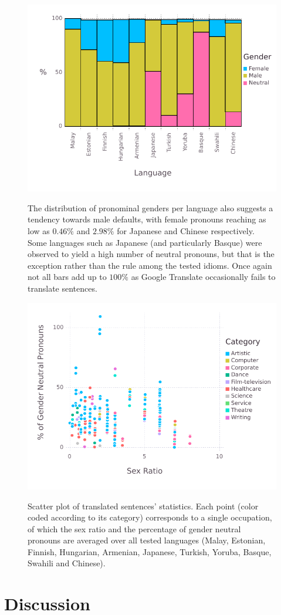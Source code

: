 \documentclass{article}
\begin{document}
\begin{figure}[H]
	\centering
	\includegraphics[width=\linewidth]{pictures/gender-by-language}
	\label{fig:gender-by-language}
	\caption{The distribution of pronominal genders per language also suggests a tendency towards male defaults, with female pronouns reaching as low as $0.46\%$ and $2.98\%$ for Japanese and Chinese respectively. Some languages such as Japanese (and particularly Basque) were observed to yield a high number of neutral pronouns, but that is the exception rather than the rule among the tested idioms. Once again not all bars add up to $100\%$ as Google Translate occasionally fails to translate sentences.}
\end{figure}

\begin{figure}[H]
	\centering
	\includegraphics[width=\linewidth]{pictures/scatterplot-languages}
	\label{fig:scatterplot-languages}
	\caption{Scatter plot of translated sentences' statistics. Each point (color coded according to its category) corresponds to a single occupation, of which the sex ratio and the percentage of gender neutral pronouns are averaged over all tested languages (Malay, Estonian, Finnish, Hungarian, Armenian, Japanese, Turkish, Yoruba, Basque, Swahili and Chinese).}
\end{figure}

\section{Discussion}



\end{document}

